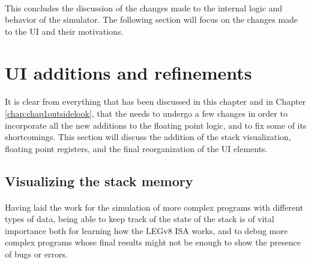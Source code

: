 \paragraph{}
This concludes the discussion of the changes made to the internal logic and behavior of the simulator. The following section will focus on the changes made to the UI and their motivations.

\section{UI additions and refinements}\label{chap:chap4UI}
\paragraph{}
It is clear from everything that has been discussed in this chapter and in Chapter \ref{chap:chap1outsidelook}, that the needs to undergo a few changes in order to incorporate all the new additions to the floating point logic, and to fix some of its shortcomings. This section will discuss the addition of the stack visualization, floating point registers, and the final reorganization of the UI elements.
\subsection{Visualizing the stack memory}
\paragraph{}
Having laid the work for the simulation of more complex programs with different types of data, being able to keep track of the state of the stack is of vital importance both for learning how the LEGv8 ISA works, and to debug more complex programs whose final results might not be enough to show the presence of bugs or errors.
